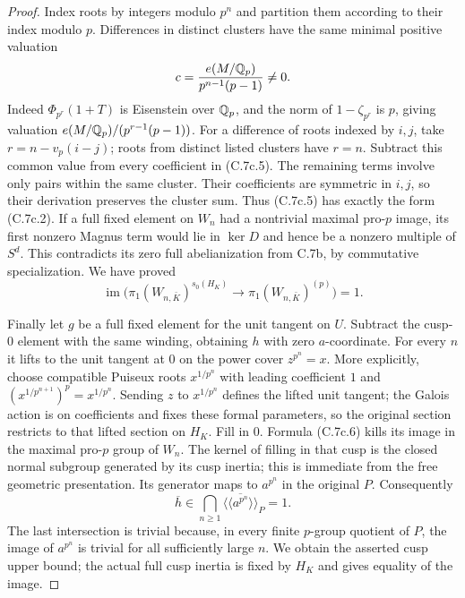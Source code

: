 \begin{proof}
Index roots by integers modulo $p^n$ and partition them according to their
index modulo $p$. Differences in distinct clusters have the same minimal
positive valuation
\[
 c=\frac{e(M/\mathbb Q_p)}{p^{n-1}(p-1)}\ne0.
\]
Indeed $\Phi_{p^r}(1+T)$ is Eisenstein over $\mathbb Q_p$, and the norm
of $1-\zeta_{p^r}$ is $p$, giving valuation
$e(M/\mathbb Q_p)/(p^{r-1}(p-1))$. For a difference of roots indexed by
$i,j$, take $r=n-v_p(i-j)$; roots from distinct listed clusters have
$r=n$. Subtract this common value from every coefficient in (C.7c.5).
The remaining terms involve only pairs within the same cluster.
Their coefficients are symmetric in $i,j$, so their derivation preserves
the cluster sum. Thus (C.7c.5) has exactly the form (C.7c.2).
If a full fixed element on $W_n$ had a nontrivial maximal pro-$p$ image,
its first nonzero Magnus term would lie in $\ker D$ and hence be a
nonzero multiple of $S^d$. This contradicts its zero full abelianization
from C.7b, by commutative specialization. We have proved
\[
 \operatorname{im}\bigl(\pi_1(W_{n,\bar K})^{s_0(H_K)}
                   \to\pi_1(W_{n,\bar K})^{(p)}\bigr)=1.      \tag{C.7c.6}
\]

Finally let $g$ be a full fixed element for the unit tangent on $U$.
Subtract the cusp-$0$ element with the same winding, obtaining $h$ with
zero $a$-coordinate. For every $n$ it lifts to the unit tangent at $0$
on the power cover $z^{p^n}=x$. More explicitly, choose compatible
Puiseux roots $x^{1/p^n}$ with leading coefficient $1$ and
$(x^{1/p^{n+1}})^p=x^{1/p^n}$. Sending $z$ to $x^{1/p^n}$ defines the
lifted unit tangent; the Galois action is on coefficients and fixes these
formal parameters, so the original section restricts to that lifted
section on $H_K$. Fill in $0$. Formula (C.7c.6) kills its
image in the maximal pro-$p$ group of $W_n$. The kernel of filling in
that cusp is the closed normal subgroup generated by its cusp inertia;
this is immediate from the free geometric presentation. Its generator
maps to $a^{p^n}$ in the original $P$. Consequently
\[
 \overline h\in\bigcap_{n\ge1}
       \overline{\langle\!\langle a^{p^n}\rangle\!\rangle}_P=1.
\]
The last intersection is trivial because, in every finite $p$-group
quotient of $P$, the image of $a^{p^n}$ is trivial for all sufficiently
large $n$. We obtain the asserted cusp upper bound; the actual full cusp
inertia is fixed by $H_K$ and gives equality of the image.
\end{proof}
